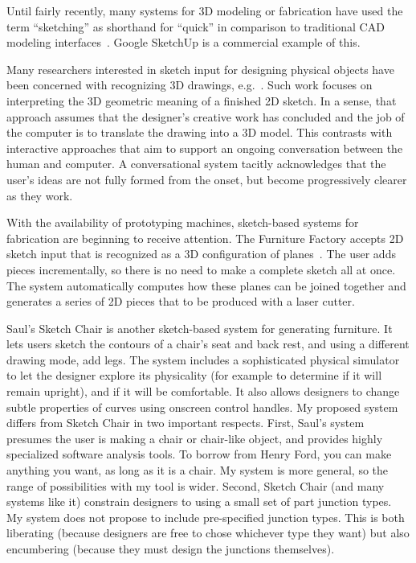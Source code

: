 \documentclass[12pt]{article}
\begin{document}
Until fairly recently, many systems for 3D modeling or fabrication
have used the term ``sketching'' as shorthand for ``quick'' in
comparison to traditional CAD modeling
interfaces~\cite{bloomenthal-sketch-n-make,pugh-thesis-viking,zeleznik-sketch}. Google
SketchUp is a commercial example of this.

Many researchers interested in sketch input for designing physical
objects have been concerned with recognizing 3D drawings,
e.g.~\cite{lipson-correlation,masry-3d-sketch}. Such work focuses on
interpreting the 3D geometric meaning of a finished 2D sketch. In a
sense, that approach assumes that the designer's creative work has
concluded and the job of the computer is to translate the drawing into
a 3D model. This contrasts with interactive approaches that aim to
support an ongoing conversation between the human and computer. A
conversational system tacitly acknowledges that the user's ideas are
not fully formed from the onset, but become progressively clearer as
they work.

With the availability of prototyping machines, sketch-based systems
for fabrication are beginning to receive attention. The Furniture
Factory accepts 2D sketch input that is recognized as a 3D
configuration of planes~\cite{oh-fab}. The user adds pieces
incrementally, so there is no need to make a complete sketch all at
once. The system automatically computes how these planes can be joined
together and generates a series of 2D pieces that to be produced with
a laser cutter.

Saul's Sketch Chair \cite{saul-sketch-chair} is another sketch-based
system for generating furniture. It lets users sketch the contours of
a chair's seat and back rest, and using a different drawing mode, add
legs. The system includes a sophisticated physical simulator to let
the designer explore its physicality (for example to determine if it
will remain upright), and if it will be comfortable. It also allows
designers to change subtle properties of curves using onscreen control
handles. My proposed system differs from Sketch Chair in two important
respects. First, Saul's system presumes the user is making a chair or
chair-like object, and provides highly specialized software analysis
tools. To borrow from Henry Ford, you can make anything you want, as
long as it is a chair. My system is more general, so the range of
possibilities with my tool is wider. Second, Sketch Chair (and many
systems like it) constrain designers to using a small set of part
junction types. My system does not propose to include pre-specified
junction types. This is both liberating (because designers are free to
chose whichever type they want) but also encumbering (because they
must design the junctions themselves).
\end{document}
